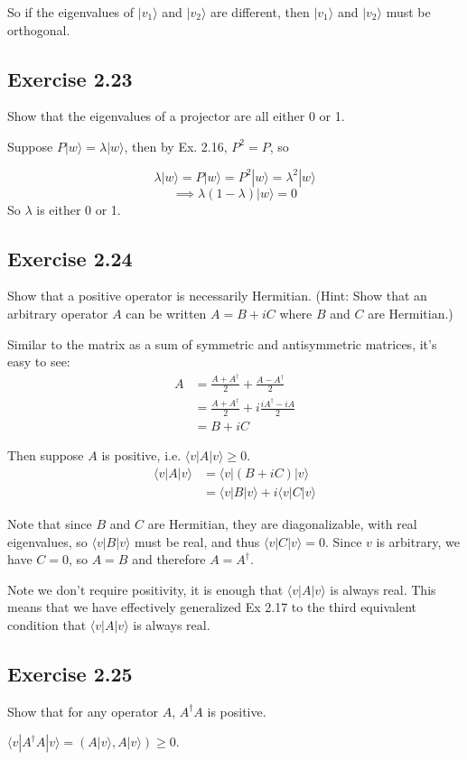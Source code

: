 \documentclass[]{article}
\newcommand{\bra}[1]{\langle #1 |}
\newcommand{\ket}[1]{| #1 \rangle}
\begin{document}
So if the eigenvalues of $\ket{v_1}$ and $\ket{v_2}$ are different, then $\ket{v_1}$ and $\ket{v_2}$ must be orthogonal.

\subsection{Exercise 2.23}

Show that the eigenvalues of a projector are all either 0 or 1.

Suppose $P\ket{w} = \lambda\ket{w}$, then by Ex. 2.16, $P^2=P$, so

\[\lambda\ket{w}=P\ket{w}=P^2\ket{w}=\lambda^2\ket{w}\]
\[\implies \lambda(1-\lambda)\ket{w}=0\]
So $\lambda$ is either 0 or 1.

\subsection{Exercise 2.24}
Show that a positive operator is necessarily Hermitian. (Hint: Show that an arbitrary operator $A$ can be written $A=B+iC$ where $B$ and $C$ are Hermitian.)

Similar to the matrix as a sum of symmetric and antisymmetric matrices, it's easy to see:
\begin{align*}
A &= \frac{A+A^\dagger}{2} + \frac{A-A^\dagger}{2} \\
&= \frac{A+A^\dagger}{2} + i\frac{iA^\dagger-iA}{2} \\
&= B + iC
\end{align*}

Then suppose $A$ is positive, i.e. $\bra{v}A\ket{v} \geq 0$.
\begin{align*}
\bra{v}A\ket{v}
&= \bra{v}(B + iC)\ket{v} \\
&= \bra{v}B\ket{v} + i\bra{v}C\ket{v}
\end{align*}

Note that since $B$ and $C$ are Hermitian, they are diagonalizable, with real eigenvalues, so $\bra{v}B\ket{v}$ must be real, and thus $\bra{v}C\ket{v} = 0$. Since $v$ is arbitrary, we have $C = 0$, so $A = B$ and therefore $A = A^\dagger$.

Note we don't require positivity, it is enough that $\bra{v}A\ket{v}$ is always real. This means that we have effectively generalized Ex 2.17 to the third equivalent condition that $\bra{v}A\ket{v}$ is always real.

\subsection{Exercise 2.25}

Show that for any operator $A$, $A^\dagger A$ is positive.

$\bra{v}A^\dagger A\ket{v} = (A\ket{v}, A\ket{v}) \geq 0$.
\end{document}
